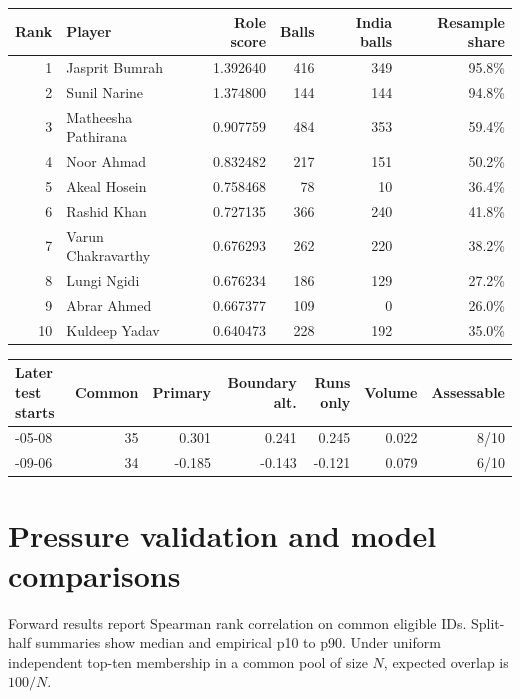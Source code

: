 \begin{center}
\begin{tabularx}{\linewidth}{r>{\raggedright\arraybackslash}Xrrrr}
\toprule
Rank & Player & Role score & Balls & India balls & Resample share \\
\midrule
1 & Jasprit Bumrah & 1.392640 & 416 & 349 & 95.8\% \\
2 & Sunil Narine & 1.374800 & 144 & 144 & 94.8\% \\
3 & Matheesha Pathirana & 0.907759 & 484 & 353 & 59.4\% \\
4 & Noor Ahmad & 0.832482 & 217 & 151 & 50.2\% \\
5 & Akeal Hosein & 0.758468 & 78 & 10 & 36.4\% \\
6 & Rashid Khan & 0.727135 & 366 & 240 & 41.8\% \\
7 & Varun Chakravarthy & 0.676293 & 262 & 220 & 38.2\% \\
8 & Lungi Ngidi & 0.676234 & 186 & 129 & 27.2\% \\
9 & Abrar Ahmed & 0.667377 & 109 & 0 & 26.0\% \\
10 & Kuldeep Yadav & 0.640473 & 228 & 192 & 35.0\% \\
\bottomrule
\end{tabularx}
\end{center}

\begin{center}
\begin{tabularx}{\linewidth}{>{\raggedright\arraybackslash}Xrrrrrr}
\toprule
Later test starts & Common & Primary & Boundary alt. & Runs only & Volume & Assessable \\
\midrule
2024-05-08 & 35 & 0.301 & 0.241 & 0.245 & 0.022 & 8/10 \\
2025-09-06 & 34 & -0.185 & -0.143 & -0.121 & 0.079 & 6/10 \\
\bottomrule
\end{tabularx}
\end{center}

\clearpage

\section{Pressure validation and model comparisons}

Forward results report Spearman rank correlation on common eligible IDs. Split-half summaries show median and empirical p10 to p90. Under uniform independent top-ten membership in a common pool of size $N$, expected overlap is $100/N$.

